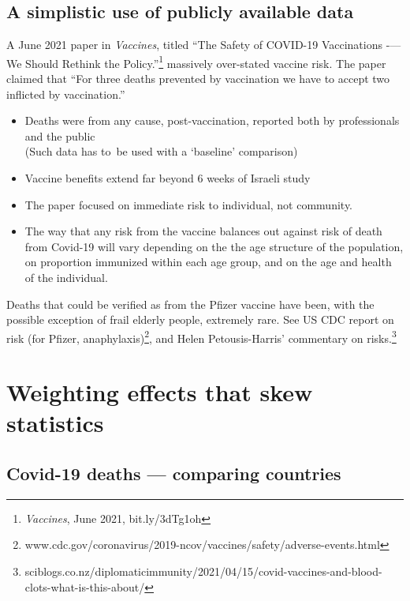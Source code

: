 \documentclass[
  10pt,
  b5paper]{book}
\providecommand{\tightlist}{%
  \setlength{\itemsep}{0pt}\setlength{\parskip}{0pt}}
\begin{document}
\hypertarget{a-simplistic-use-of-publicly-available-data}{%
\section{A simplistic use of publicly available data}\label{a-simplistic-use-of-publicly-available-data}}

A June 2021 paper in \emph{Vaccines}, titled
``The Safety of COVID-19 Vaccinations -\/--- We Should Rethink the Policy.''\footnote{\emph{Vaccines}, June 2021, bit.ly/3dTg1oh}
massively over-stated vaccine risk. The paper claimed that
``For three deaths prevented by vaccination we have to accept
two inflicted by vaccination.''

\begin{itemize}
\tightlist
\item
  Deaths were from any cause, post-vaccination, reported both by
  professionals and the public\\
  (Such data has to~be used with a `baseline' comparison)
\item
  Vaccine benefits extend far beyond 6 weeks of Israeli study
\item
  The paper focused on immediate risk to individual, not community.
\item
  The way that any risk from the vaccine balances out against
  risk of death from Covid-19 will vary depending on the the age
  structure of the population, on proportion immunized within
  each age group, and on the age and health of the individual.
\end{itemize}

Deaths that could be verified as from the Pfizer vaccine have been,
with the possible exception of frail elderly people, extremely rare.
See US CDC report on risk (for Pfizer, anaphylaxis)\footnote{www.cdc.gov/coronavirus/2019-ncov/vaccines/safety/adverse-events.html},
and Helen Petousis-Harris' commentary on risks.\footnote{sciblogs.co.nz/diplomaticimmunity/2021/04/15/covid-vaccines-and-blood-clots-what-is-this-about/}

\hypertarget{sec:yule1}{%
\chapter{Weighting effects that skew statistics}\label{sec:yule1}}

\hypertarget{covid-19-deaths-comparing-countries}{%
\section{Covid-19 deaths --- comparing countries}\label{covid-19-deaths-comparing-countries}}
\end{document}

